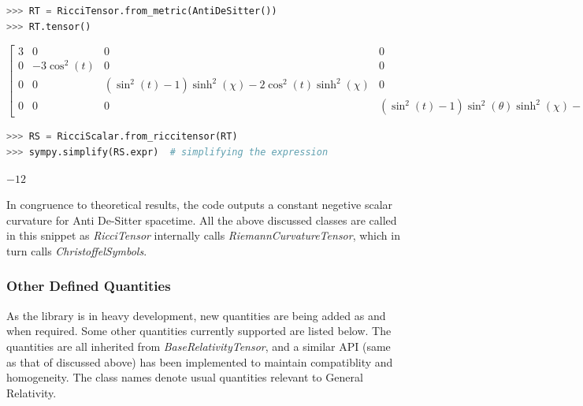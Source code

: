 \documentclass[onecolumn]{aa}
\begin{document}
\begin{lstlisting}[language=Python, caption=Obtaining Ricci Tensor from the metric]
>>> RT = RicciTensor.from_metric(AntiDeSitter())
>>> RT.tensor()
\end{lstlisting}

\begin{center}
$\displaystyle \left[\begin{matrix}3 & 0 & 0 & 0\\0 & - 3 \cos^{2}{\left(t \right)} & 0 & 0\\0 & 0 & \left(\sin^{2}{\left(t \right)} - 1\right) \sinh^{2}{\left(\chi \right)} - 2 \cos^{2}{\left(t \right)} \sinh^{2}{\left(\chi \right)} & 0\\0 & 0 & 0 & \left(\sin^{2}{\left(t \right)} - 1\right) \sin^{2}{\left(\theta \right)} \sinh^{2}{\left(\chi \right)} - 2 \sin^{2}{\left(\theta \right)} \cos^{2}{\left(t \right)} \sinh^{2}{\left(\chi \right)}\end{matrix}\right]$
\end{center}

\begin{lstlisting}[language=Python, caption=Deriving Ricci(Curvature) Scalar from Ricci Tensor]
>>> RS = RicciScalar.from_riccitensor(RT)
>>> sympy.simplify(RS.expr)  # simplifying the expression
\end{lstlisting}

\begin{center}
$\displaystyle -12$
\end{center}


In congruence to theoretical results, the code outputs a constant negetive scalar curvature for Anti De-Sitter spacetime. All the above discussed classes are called in this snippet as \textit{RicciTensor} internally calls \textit{RiemannCurvatureTensor}, which in turn calls \textit{ChristoffelSymbols}.


\subsubsection{Other Defined Quantities}\label{subsubsec:other}

As the library is in heavy development, new quantities are being added as and when required. Some other quantities currently supported are listed below. The quantities are all inherited from \textit{BaseRelativityTensor}, and a similar API (same as that of discussed above) has been implemented to maintain compatiblity and homogeneity. The class names denote usual quantities relevant to General Relativity.
\end{document}
